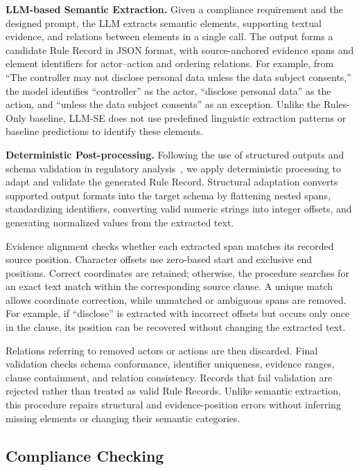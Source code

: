 \documentclass[conference]{IEEEtran}
\begin{document}
\textbf{LLM-based Semantic Extraction.} Given a compliance requirement and the designed prompt, the LLM extracts semantic elements, supporting textual evidence, and relations between elements in a single call. The output forms a candidate Rule Record in JSON format, with source-anchored evidence spans and element identifiers for actor--action and ordering relations. For example, from ``The controller may not disclose personal data unless the data subject consents,'' the model identifies ``controller'' as the actor, ``disclose personal data'' as the action, and ``unless the data subject consents'' as an exception. Unlike the Rules-Only baseline, LLM-SE does not use predefined linguistic extraction patterns or baseline predictions to identify these elements.

\textbf{Deterministic Post-processing.} Following the use of structured outputs and schema validation in regulatory analysis~\cite{barrientos2026impact}, we apply deterministic processing to adapt and validate the generated Rule Record. Structural adaptation converts supported output formats into the target schema by flattening nested spans, standardizing identifiers, converting valid numeric strings into integer offsets, and generating normalized values from the extracted text.

Evidence alignment checks whether each extracted span matches its recorded source position. Character offsets use zero-based start and exclusive end positions. Correct coordinates are retained; otherwise, the procedure searches for an exact text match within the corresponding source clause. A unique match allows coordinate correction, while unmatched or ambiguous spans are removed. For example, if ``disclose'' is extracted with incorrect offsets but occurs only once in the clause, its position can be recovered without changing the extracted text.

Relations referring to removed actors or actions are then discarded. Final validation checks schema conformance, identifier uniqueness, evidence ranges, clause containment, and relation consistency. Records that fail validation are rejected rather than treated as valid Rule Records. Unlike semantic extraction, this procedure repairs structural and evidence-position errors without inferring missing elements or changing their semantic categories.

\subsection{Compliance Checking}
\label{sec:3.3}
\end{document}
